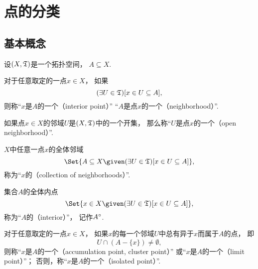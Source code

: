 \section{点的分类}
\subsection{基本概念}
\begin{definition}\label{definition:拓扑学.点的分类}
设\((X,{\mathfrak T})\)是一个拓扑空间，
\(A \subseteq X\).

对于任意取定的一点\(x \in X\)，
如果\begin{equation*}
	(\exists U\in{\mathfrak T})
	[x \in U \subseteq A],
\end{equation*}
则称“\(x\)是\(A\)的一个（interior point）”
“\(A\)是点\(x\)的一个（neighborhood）”.

如果点\(x \in X\)的邻域\(U\)是\((X,{\mathfrak T})\)中的一个开集，
那么称“\(U\)是点\(x\)的一个（open neighborhood）”.

\(X\)中任意一点\(x\)的全体邻域\begin{equation*}
	\Set{
		A \subseteq X \given (\exists U\in\T)[x \in U \subseteq A]
	},
\end{equation*}
称为“\(x\)的（collection of neighborhoods）”.

集合\(A\)的全体内点\begin{equation*}
	\Set{
		x \in X \given (\exists U\in\T)[x \in U \subseteq A]
	},
\end{equation*}
称为“\(A\)的（interior）”，
记作\(A^\circ\).

对于任意取定的一点\(x \in X\)，
如果\(x\)的每一个邻域\(U\)中总有异于\(x\)而属于\(A\)的点，
即\begin{equation*}
	U \cap (A - \{x\}) \neq \emptyset,
\end{equation*}
则称“\(x\)是\(A\)的一个（accumulation point, cluster point）”
或“\(x\)是\(A\)的一个（limit point）”；
否则，称“\(x\)是\(A\)的一个（isolated point）”.


\end{definition}
